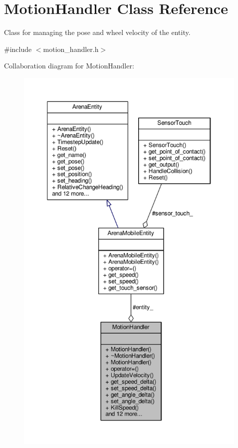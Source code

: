 \hypertarget{classMotionHandler}{}\section{Motion\+Handler Class Reference}
\label{classMotionHandler}


Class for managing the pose and wheel velocity of the entity.  




{\ttfamily \#include $<$motion\+\_\+handler.\+h$>$}



Collaboration diagram for Motion\+Handler\+:\nopagebreak
\begin{figure}[H]
\begin{center}
\leavevmode
\includegraphics[height=550pt]{classMotionHandler__coll__graph}
\end{center}
\end{figure}
